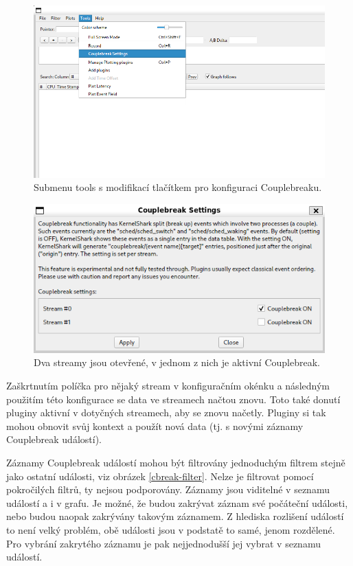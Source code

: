 \begin{figure}[p]\centering
    \includegraphics[width=140mm]{img/Modifikace/modif-couplebreak-tools}
    \caption{Submenu tools s modifikací tlačítkem pro konfiguraci Couplebreaku.}
    \label{cbreak-tools}
\end{figure}

\begin{figure}[p]\centering
    \includegraphics[width=140mm]{img/Modifikace/modif-couplebreak-multiconf}
    \caption{Dva streamy jsou otevřené, v jednom z nich je aktivní Couplebreak.}
    \label{cbreak-multiconf}
\end{figure}

Zaškrtnutím políčka pro nějaký stream v konfiguračním okénku a následným použitím této konfigurace se data ve streamech načtou znovu. Toto také donutí pluginy aktivní v dotyčných streamech, aby se znovu načetly. Pluginy si tak mohou obnovit svůj kontext a použít nová data (tj. s novými záznamy Couplebreak událostí).

Záznamy Couplebreak událostí mohou být filtrovány jednoduchým filtrem stejně jako ostatní události, viz obrázek \ref{cbreak-filter}. Nelze je filtrovat pomocí pokročilých filtrů, ty nejsou podporovány. Záznamy jsou viditelné v seznamu událostí a i v grafu. Je možné, že budou zakrývat záznam své počáteční události, nebo budou naopak zakrývány takovým záznamem. Z hlediska rozlišení událostí to není velký problém, obě události jsou v podstatě to samé, jenom rozdělené. Pro vybrání zakrytého záznamu je pak nejjednodušší jej vybrat v seznamu událostí.

